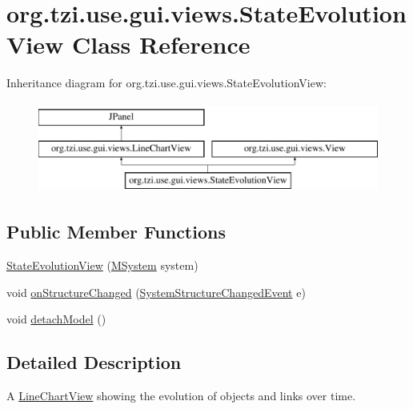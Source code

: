 \hypertarget{classorg_1_1tzi_1_1use_1_1gui_1_1views_1_1_state_evolution_view}{\section{org.\-tzi.\-use.\-gui.\-views.\-State\-Evolution\-View Class Reference}
\label{classorg_1_1tzi_1_1use_1_1gui_1_1views_1_1_state_evolution_view}
}
Inheritance diagram for org.\-tzi.\-use.\-gui.\-views.\-State\-Evolution\-View\-:\begin{figure}[H]
\begin{center}
\leavevmode
\includegraphics[height=3.000000cm]{classorg_1_1tzi_1_1use_1_1gui_1_1views_1_1_state_evolution_view}
\end{center}
\end{figure}
\subsection*{Public Member Functions}
\begin{DoxyCompactItemize}
\item 
\hyperlink{classorg_1_1tzi_1_1use_1_1gui_1_1views_1_1_state_evolution_view_a4a06098c6d8f468e394e2797f94147a5}{State\-Evolution\-View} (\hyperlink{classorg_1_1tzi_1_1use_1_1uml_1_1sys_1_1_m_system}{M\-System} system)
\item 
void \hyperlink{classorg_1_1tzi_1_1use_1_1gui_1_1views_1_1_state_evolution_view_a30d3ca1cea1890e234eac179e752dfd4}{on\-Structure\-Changed} (\hyperlink{interfaceorg_1_1tzi_1_1use_1_1uml_1_1sys_1_1events_1_1tags_1_1_system_structure_changed_event}{System\-Structure\-Changed\-Event} e)
\item 
void \hyperlink{classorg_1_1tzi_1_1use_1_1gui_1_1views_1_1_state_evolution_view_acc88b5a8c7c30deb69f439c31962cd8b}{detach\-Model} ()
\end{DoxyCompactItemize}


\subsection{Detailed Description}
A \hyperlink{classorg_1_1tzi_1_1use_1_1gui_1_1views_1_1_line_chart_view}{Line\-Chart\-View} showing the evolution of objects and links over time.

